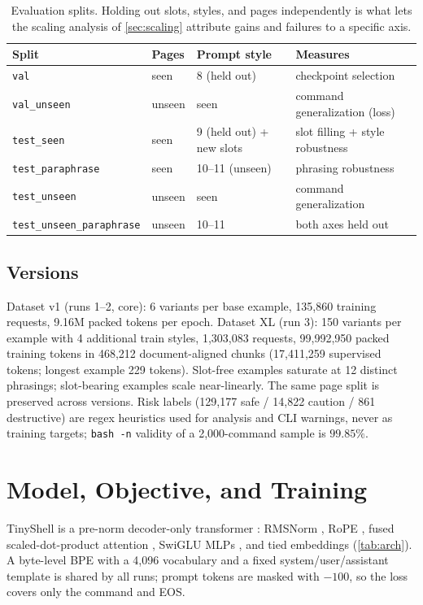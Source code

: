 \documentclass[11pt,a4paper]{article}
\newcommand{\modelname}{TinyShell}
\begin{document}
\begin{table}[t]
\centering\small
\begin{tabular}{llll}
\toprule
Split & Pages & Prompt style & Measures \\
\midrule
\texttt{val} & seen & 8 (held out) & checkpoint selection \\
\texttt{val\_unseen} & unseen & seen & command generalization (loss) \\
\texttt{test\_seen} & seen & 9 (held out) + new slots & slot filling + style robustness \\
\texttt{test\_paraphrase} & seen & 10--11 (unseen) & phrasing robustness \\
\texttt{test\_unseen} & unseen & seen & command generalization \\
\texttt{test\_unseen\_paraphrase} & unseen & 10--11 & both axes held out \\
\bottomrule
\end{tabular}
\caption{Evaluation splits. Holding out slots, styles, and pages
independently is what lets the scaling analysis of \cref{sec:scaling}
attribute gains and failures to a specific axis.}
\label{tab:splits}
\end{table}

\subsection{Versions}
Dataset v1 (runs 1--2, core): 6 variants per base example, 135,860 training
requests, 9.16M packed tokens per epoch. Dataset XL (run 3): 150 variants per
example with 4 additional train styles, 1,303,083 requests, 99,992,950 packed
training tokens in 468,212 document-aligned chunks (17,411,259 supervised
tokens; longest example 229 tokens). Slot-free examples saturate at 12
distinct phrasings; slot-bearing examples scale near-linearly. The same page
split is preserved across versions. Risk labels (129{,}177 safe / 14{,}822
caution / 861 destructive) are regex heuristics used for analysis and CLI
warnings, never as training targets; \texttt{bash -n} validity of a
2{,}000-command sample is $99.85\%$.

\section{Model, Objective, and Training}
\label{sec:model}

\modelname{} is a pre-norm decoder-only transformer
\citep{vaswani2017attention,touvron2023llama}: RMSNorm \citep{zhang2019rmsnorm},
RoPE \citep{su2021roformer}, fused scaled-dot-product attention
\citep{dao2022flashattention}, SwiGLU MLPs \citep{shazeer2020glu}, and tied
embeddings \citep{press2017tying} (\cref{tab:arch}). A byte-level BPE
\citep{sennrich2016bpe} with a 4{,}096 vocabulary and a fixed
system/user/assistant template is shared by all runs; prompt tokens are
masked with $-100$, so the loss covers only the command and EOS.
\end{document}
